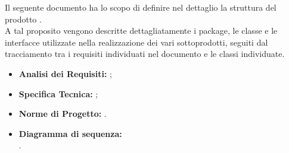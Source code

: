 
		Il seguente documento ha lo scopo di definire nel dettaglio la struttura del prodotto \groupname{}. \\ A tal proposito vengono descritte dettagliatamente i package, le classe e le interfacce utilizzate nella realizzazione dei vari sottoprodotti, seguiti dal tracciamento tra i requisiti individuati nel documento  e le classi individuate.

	


			\begin{itemize}
				\item \textbf{Analisi dei Requisiti:} ;
				\item \textbf{Specifica Tecnica:} ;
				\item \textbf{Norme di Progetto:} .
			\end{itemize}
			\begin{itemize}
				\item \textbf{Diagramma di sequenza:} \\ 
				.
			\end{itemize}